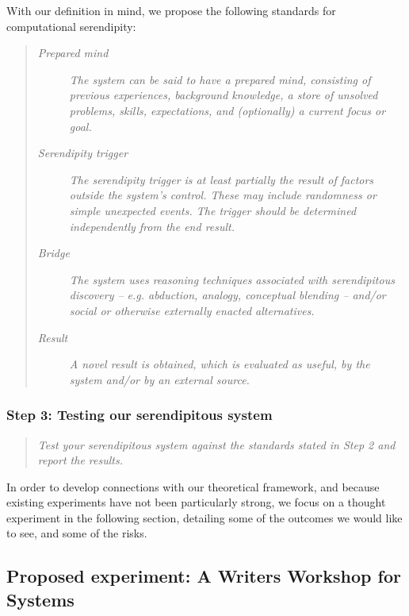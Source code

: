 With our definition in mind, we propose the following standards for
computational serendipity:

\begin{quote}
\begin{description}
\item[\emph{Prepared mind}] \emph{The system can be said to have a
  prepared mind, consisting of previous experiences, background
  knowledge, a store of unsolved problems, skills, expectations, and
  (optionally) a current focus or goal.}
\item[\emph{Serendipity trigger}] \emph{The serendipity trigger is at
  least partially the result of factors outside the system's control.
  These may include randomness or simple unexpected events.  The
  trigger should be determined independently from the end result.}
\item[\emph{Bridge}] \emph{The system uses reasoning techniques
  associated with serendipitous discovery -- e.g.  abduction, analogy,
  conceptual blending -- and/or social or otherwise externally enacted
  alternatives.}
\item[\emph{Result}] \emph{A novel result is obtained, which is
  evaluated as useful, by the system and/or by an external source.}
\end{description}
\end{quote}

\subsubsection*{Step 3: Testing our serendipitous system}

\begin{quote} {\em Test your serendipitous system against the standards stated in Step 2 and report the
results.}\end{quote}

In order to develop connections with our theoretical framework, and
because existing experiments have not been particularly strong, we
focus on a thought experiment in the following section, detailing some
of the outcomes we would like to see, and some of the risks.

\subsection{Proposed experiment: A Writers Workshop for Systems} \label{sec:writers-workshop}

